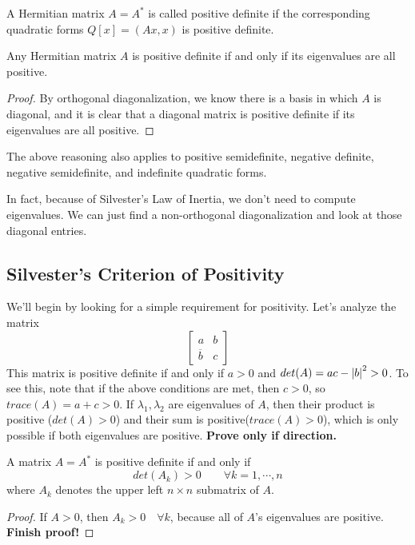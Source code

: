 A Hermitian matrix $A = A^{*}$ is called positive definite if the corresponding quadratic forms $Q[x] = (Ax, x)$ is positive definite. 

\begin{theorem}
Any Hermitian matrix $A$ is positive definite if and only if its eigenvalues are all positive.
\end{theorem}

\begin{proof}
By orthogonal diagonalization, we know there is a basis in which $A$ is diagonal, and it is clear that a diagonal matrix is positive definite if its eigenvalues are all positive. 
\end{proof}

The above reasoning also applies to positive semidefinite, negative definite, negative semidefinite, and indefinite quadratic forms. 

In fact, because of Silvester's Law of Inertia, we don't need to compute eigenvalues. We can just find a non-orthogonal diagonalization and look at those diagonal entries. 

\subsection{Silvester's Criterion of Positivity}

We'll begin by looking for a simple requirement for positivity. Let's analyze the matrix 
$$\begin{bmatrix}
a & b \\
\overline{b} & c
\end{bmatrix}$$
This matrix is positive definite if and only if $a > 0$ and $det(A)= ac - \abs{b}^{2} > 0$. To see this, note that if the above conditions are met, then $c > 0$, so $trace(A) = a + c > 0$. If $\lambda_{1}, \lambda_{2}$ are eigenvalues of $A$, then their product is positive ($det(A) > 0$) and their sum is positive($trace(A) > 0$), which is only possible if both eigenvalues are positive. \textbf{Prove only if direction.}

\begin{theorem} 
A matrix $A = A^{*}$ is positive definite if and only if 
$$det(A_{k}) > 0 \qquad \forall k = 1, \cdots, n$$
where $A_{k}$ denotes the upper left $n \times n$ submatrix of $A$. 
\end{theorem}

\begin{proof}
If $A > 0$, then $A_{k} > 0 \quad \forall k$, because all of $A$'s eigenvalues are positive. 
\textbf{Finish proof!}
\end{proof}

